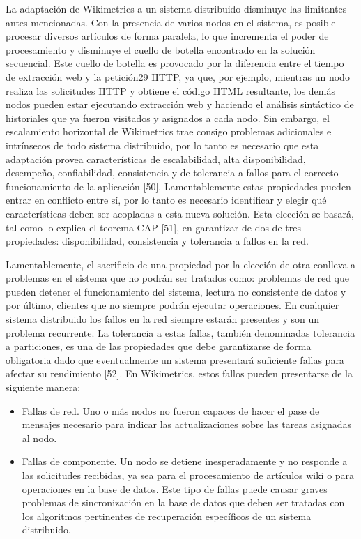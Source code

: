 La adaptación de Wikimetrics a un sistema distribuido disminuye las limitantes antes
mencionadas. Con la presencia de varios nodos en el sistema, es posible procesar
diversos artículos de forma paralela, lo que incrementa el poder de procesamiento y
disminuye el cuello de botella encontrado en la solución secuencial. Este cuello de
botella es provocado por la diferencia entre el tiempo de extracción web y la petición29
HTTP, ya que, por ejemplo, mientras un nodo realiza las solicitudes HTTP y obtiene el
código HTML resultante, los demás nodos pueden estar ejecutando extracción web y
haciendo el análisis sintáctico de historiales que ya fueron visitados y asignados a cada
nodo. Sin embargo, el escalamiento horizontal de Wikimetrics trae consigo problemas
adicionales e intrínsecos de todo sistema distribuido, por lo tanto es necesario que esta
adaptación provea características de escalabilidad, alta disponibilidad, desempeño,
confiabilidad, consistencia y de tolerancia a fallos para el correcto funcionamiento de la
aplicación [50]. Lamentablemente estas propiedades pueden entrar en conflicto entre
sí, por lo tanto es necesario identificar y elegir qué características deben ser acopladas a
esta nueva solución. Esta elección se basará, tal como lo explica el teorema CAP [51], en
garantizar de dos de tres propiedades: disponibilidad, consistencia y tolerancia a fallos
en la red.

Lamentablemente, el sacrificio de una propiedad por la elección de otra conlleva a
problemas en el sistema que no podrán ser tratados como: problemas de red que
pueden detener el funcionamiento del sistema, lectura no consistente de datos y por
último, clientes que no siempre podrán ejecutar operaciones.
En cualquier sistema distribuido los fallos en la red siempre estarán presentes y son
un problema recurrente. La tolerancia a estas fallas, también denominadas tolerancia a
particiones, es una de las propiedades que debe garantizarse de forma obligatoria dado
que eventualmente un sistema presentará suficiente fallas para afectar su rendimiento
[52]. En Wikimetrics, estos fallos pueden presentarse de la siguiente manera:

\begin{itemize}
\item Fallas de red. Uno o más nodos no fueron capaces de hacer el pase de mensajes
necesario para indicar las actualizaciones sobre las tareas asignadas al nodo.

\item Fallas de componente. Un nodo se detiene inesperadamente y no responde a las
solicitudes recibidas, ya sea para el procesamiento de artículos wiki o para
operaciones en la base de datos. Este tipo de fallas puede causar graves
problemas de sincronización en la base de datos que deben ser tratadas con los
algoritmos pertinentes de recuperación específicos de un sistema distribuido.
\end{itemize}

